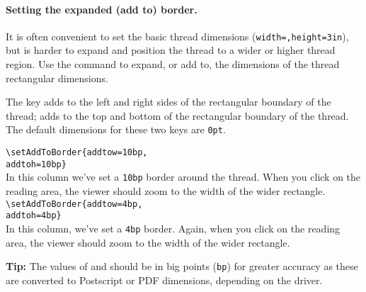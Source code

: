 \documentclass{article}
\begin{document}
\paragraph*{Setting the expanded (add to) border.} It is often convenient to
set the basic thread dimensions (\texttt{width=,height=3in}),
but is harder to expand and position the thread to a wider or higher thread
region. Use the  command to expand, or add to, the
dimensions of the thread rectangular dimensions.
\bVerb{}%
\begin{dCmd}[commandchars=!()]{\bxSize}
\end{dCmd}
\endgroup\noindent The  key adds  to the left and right
sides of the rectangular boundary of the thread;  adds
 to the top and bottom of the rectangular boundary of the
thread. The default dimensions for these two keys are \texttt{0pt}.
\begin{multicols}{2}%
\noindent{}\previewtrue\viewMagWintrue
{\small\verb|\setAddToBorder{addtow=10bp,|\\
\null\qquad\verb|addtoh=10bp}|}\\
In this column we've set a \texttt{10bp} border around the thread. When you click
on the reading area, the viewer should zoom to the width of the wider rectangle.
\vfill
\columnbreak
\noindent{}\previewtrue\viewMagWintrue
{\small\verb|\setAddToBorder{addtow=4bp,|\\
\null\qquad\verb|addtoh=4bp}|}\\
In this column, we've set a \texttt{4bp} border. Again, when you click on the
reading area, the viewer should zoom to the width of the wider rectangle.
\end{multicols}
\newtopic\noindent\textbf{Tip:} The values of  and  should be in big
points (\texttt{bp}) for greater accuracy as these are converted to
Postscript or PDF dimensions, depending on the driver.
\end{document}
